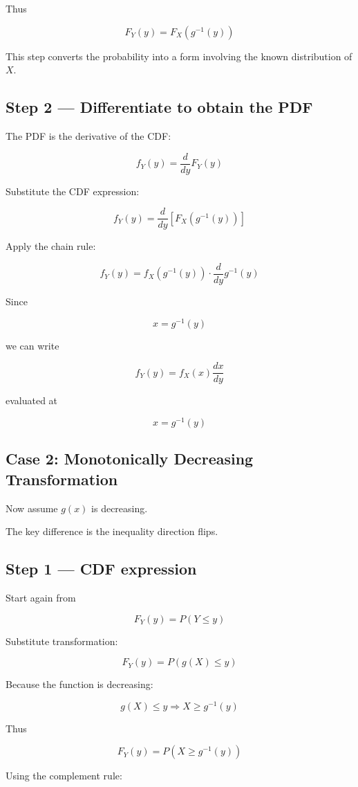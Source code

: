 \documentclass{article}
\begin{document}
Thus

\[
F_Y(y) = F_X(g^{-1}(y))
\]

This step converts the probability into a form involving the known distribution of $X$.

\subsection*{Step 2 — Differentiate to obtain the PDF}

The PDF is the derivative of the CDF:

\[
f_Y(y) = \frac{d}{dy}F_Y(y)
\]

Substitute the CDF expression:

\[
f_Y(y) = \frac{d}{dy}[F_X(g^{-1}(y))]
\]

Apply the chain rule:

\[
f_Y(y) = f_X(g^{-1}(y)) \cdot \frac{d}{dy}g^{-1}(y)
\]

Since

\[
x = g^{-1}(y)
\]

we can write

\[
f_Y(y) = f_X(x)\frac{dx}{dy}
\]

evaluated at

\[
x = g^{-1}(y)
\]

\subsection*{Case 2: Monotonically Decreasing Transformation}

Now assume $g(x)$ is decreasing.

The key difference is the inequality direction flips.

\subsection*{Step 1 — CDF expression}

Start again from

\[
F_Y(y) = P(Y \le y)
\]

Substitute transformation:

\[
F_Y(y) = P(g(X) \le y)
\]

Because the function is decreasing:

\[
g(X) \le y \Rightarrow X \ge g^{-1}(y)
\]

Thus

\[
F_Y(y) = P(X \ge g^{-1}(y))
\]

Using the complement rule:
\end{document}
